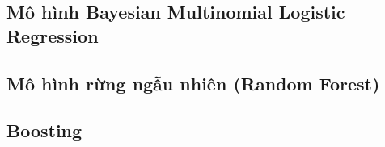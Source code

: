 \documentclass[14pt, a4paper]{article}
\theoremstyle{sltheorem}
\theoremstyle{soltheorem}
\begin{document}
    

    \subsection{ Mô hình Bayesian Multinomial Logistic Regression}

    

    \subsection{Mô hình rừng ngẫu nhiên (Random Forest)}

    

    \subsection{Boosting}
    
    



\printbibliography[title={TÀI LIỆU THAM KHẢO}]
\end{document}
